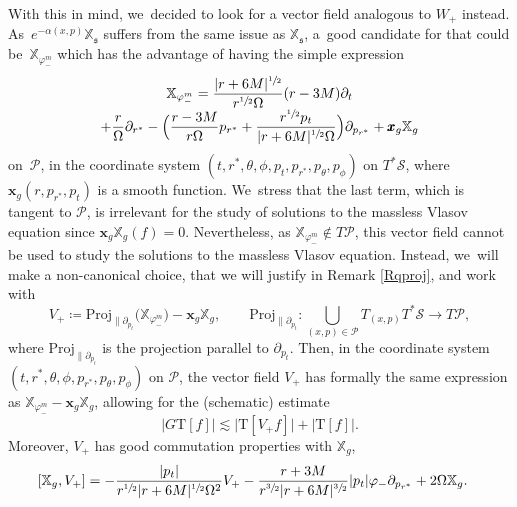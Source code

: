\documentclass[JEP,XML,SOM,Unicode,published]{cedram}
\theoremstyle{plain}
\theoremstyle{definition}
\newcommand\T{{\mathbb{X}}}
\begin{document}
With this in mind, we~decided to look for a vector field analogous to $W_+$ instead. As~$e^{-\alpha (x,p)}\T_{\mathfrak{s}}$ suffers from the same issue as $\T_{\mathfrak{s}}$, a~good candidate for that could be~$\T_{\varphi_-^m}$ which has the advantage of having the simple expression\vspace*{-5pt}
\begin{multline}\label{eq:expTphi}
\T_{\varphi_-^m} = \frac{|r+6M|^{\sfrac{1}{2}}}{r^{\sfrac{1}{2}}\Omega}(r-3M) \partial_t\\[-3pt]
+\frac{r}{\Omega} \partial_{r^*}-\Bigl(\frac{r-3M}{r\Omega}p_{r^*}+\frac{r^{\sfrac{1}{2}}p_t}{|r+6M|^{\sfrac{1}{2}} \Omega} \Bigr) \partial_{p_{r^*}}+\pmb{x}_g \T_g
\end{multline}
on \,$\mathcal{P}$, in the coordinate system $(t,r^*,\theta, \phi, p_t,p_{r^*},p_\theta, p_\phi)$ on $T^* \mathcal{S}$, where $\pmb{x}_g(r,p_{r^*},p_t)$ is a smooth function. We~stress that the last term, which is tangent to $\mathcal{P}$, is irrelevant for the study of solutions to the massless Vlasov equation since $\pmb{x}_g \T_g(f)=0$. Nevertheless, as $\T_{\varphi_-^m} \notin T \mathcal{P}$, this vector field cannot be used to study the solutions to the massless Vlasov equation. Instead, we~will make a non-canonical choice, that we will justify in Remark \ref{Rqproj}, and work with\vspace*{-3pt}
\[
V_+ \coloneqq \mathrm{Proj}_{\parallel \partial_{p_t}}\bigl(\T_{\varphi_-^m} \bigr)-\pmb{x}_g \T_g,\qquad \mathrm{Proj}_{\parallel \partial_{p_t}} : \bigcup_{(x,p) \in \mathcal{P}} T_{(x,p)} T^* \mathcal{S} \to T \mathcal{P},
\]
where $\mathrm{Proj}_{\parallel \partial_{p_t}} $ is the projection parallel to $\partial_{p_t}$. Then, in the coordinate system $(t,r^*,\theta, \phi,p_{r^*},p_\theta, p_\phi)$ on $\mathcal{P}$, the vector field $V_+$ has formally the same expression as $\T_{\varphi_-^m}-\pmb{x}_g \T_g$, allowing for the (schematic) estimate\vspace*{-3pt}
\begin{equation}\label{eq:Gderiv}
\big| G \mathrm{T}[f] \big| \lesssim \big|\mathrm{T}[V_+ f]\big|+\big|\mathrm{T}[f] \big|.
\end{equation}
Moreover, $V_+$ has good commutation properties with $\T_g$,
\begin{align}\label{eq:ComVplusinto}
[\T_g,V_+] &= - \frac{|p_t|}{r^{\sfrac{1}{2}}|r+6M|^{\sfrac{1}{2}}\Omega^2} V_+- \frac{r+3M}{r^{\sfrac{3}{2}}|r+6M|^{\sfrac{3}{2}}}|p_t|\varphi_- \partial_{p_{r^*}} + 2\Omega \T_g.
\end{align}
\end{document}
